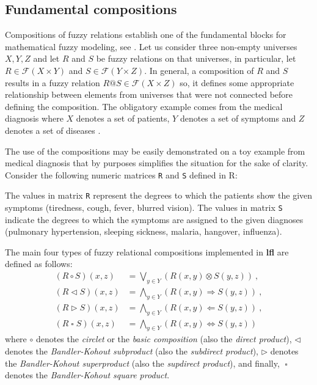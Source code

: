 \documentclass[review]{elsarticle}
\newcommand{\pkg}[1]{\textbf{#1}}
\newcommand{\proglang}[1]{#1}
\newcommand{\code}[1]{\texttt{#1}}
\newcommand{\R}{\proglang{R}}
\newcommand{\squ}{\mathop{\scriptstyle \square}\nolimits}
\begin{document}
\subsection{Fundamental compositions}
\label{sec:fundcomp}

Compositions of fuzzy relations establish one of the fundamental blocks for mathematical fuzzy modeling, see \cite{Belohlavek_book2002,DeBaetsKerre_compoositions93}. Let us consider three non-empty universes $X,Y,Z$ and let $R$ and $S$ be fuzzy relations on that universes, in particular, let $R\in\mathcal{F}(X\times Y)$ and $S\in\mathcal{F}(Y\times Z)$. In general, a composition of $R$ and $S$ results in a fuzzy relation $R@S\in\mathcal{F}(X\times Z)$ so, it defines some appropriate relationship between elements from universes that were not connected before defining the composition. The obligatory example comes from the medical diagnosis where $X$ denotes a set of patients, $Y$ denotes a set of symptoms and $Z$ denotes a set of diseases \citep{BandlerKohout78}. 

The use of the compositions may be easily demonstrated on a toy example from medical diagnosis that by purposes simplifies the situation for the sake of clarity. Consider the following numeric matrices \code{R} and \code{S} defined in \R{}:
%

%
The values in matrix \code{R} represent the degrees to which the patients show the given symptoms (tiredness, cough, fever, blurred vision). The values in matrix \code{S} indicate the degrees to which the symptoms are assigned to the given diagnoses (pulmonary hypertension, sleeping sickness, malaria, hangover, influenza).

The main four types of fuzzy relational compositions implemented in \pkg{lfl} are defined as follows:
%
\begin{align}
   ( R\circ S )(x,z) & = \bigvee_{y\in Y} \left( R(x,y) \otimes S(y,z)\right) \ ,\label{form:circ}\\
    (R\lhd S )(x,z) & = \bigwedge_{y\in Y} ( R(x,y) \Rightarrow S(y,z)) \ , \label{form:lhd}\\
    (R\rhd S )(x,z) & = \bigwedge_{y\in Y} ( R(x,y) \Leftarrow S(y,z)) \ , \label{form:rhd}\\
    (R\squ S )(x,z) & = \bigwedge_{y\in Y} ( R(x,y) \Leftrightarrow S(y,z))  \label{form:squ}
\end{align}
%
where $\circ$ denotes the \emph{circlet} or the \emph{basic composition} (also the \emph{direct product}), $\lhd$ denotes the \emph{Bandler-Kohout subproduct} (also the \emph{subdirect product}),  $\rhd$ denotes the \emph{Bandler-Kohout superproduct} (also the \emph{supdirect product}), and finally, $\squ$ denotes the \emph{Bandler-Kohout square product}. 
\end{document}
